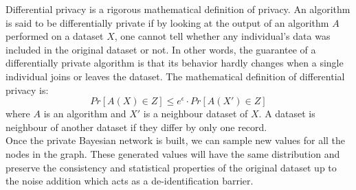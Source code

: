 Differential privacy is a rigorous mathematical definition of privacy. An algorithm is said to be differentially private if by looking at the output of an algorithm $A$ performed on a dataset $X$, one cannot tell whether any individual's data was included in the original dataset or not. In other words, the guarantee of a differentially private algorithm is that its behavior hardly changes when a single individual joins or leaves the dataset.
The mathematical definition of differential privacy is:
\begin{equation*}
    Pr[A(X) \in Z] \leq e^{\epsilon} \cdot Pr[A(X') \in Z]
\end{equation*}
where $A$ is an algorithm and $X'$ is a neighbour dataset of $X$. A dataset is neighbour of another dataset if they differ by only one record. \\ 
Once the private Bayesian network is built, we can sample new values for all the nodes in the graph. These generated values will have the same distribution and preserve the consistency and statistical properties of the original dataset up to the noise addition which acts as a de-identification barrier. 
